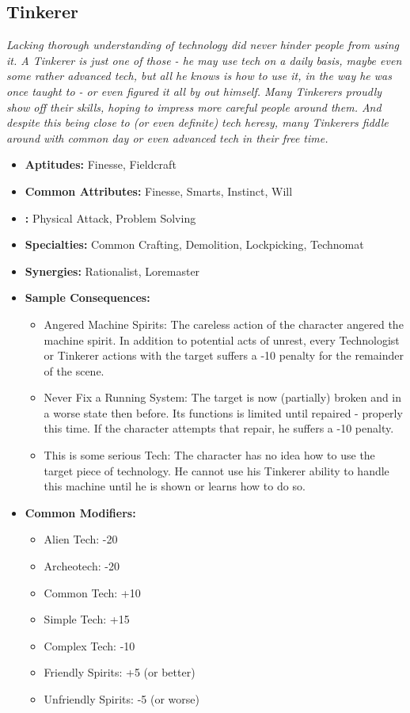 \subsection{Tinkerer}\label{Tinkerer}
\textit{Lacking thorough understanding of technology did never hinder people from using it.
A Tinkerer is just one of those - he may use tech on a daily basis, maybe even some rather advanced tech, but all he knows is how to use it, in the way he was once taught to - or even figured it all by out himself.
Many Tinkerers proudly show off their skills, hoping to impress more careful people around them.
And despite this being close to (or even definite) tech heresy, many Tinkerers fiddle around with common day or even advanced tech in their free time.}
\begin{itemize}
	\item \textbf{Aptitudes:} Finesse, Fieldcraft
	\item \textbf{Common Attributes:} Finesse, Smarts, Instinct, Will
	\item \textbf{:} Physical Attack, Problem Solving
	\item \textbf{Specialties:} Common Crafting, Demolition, Lockpicking, Technomat
	\item \textbf{Synergies:} Rationalist, Loremaster
	\item \textbf{Sample Consequences:} 
	\begin{itemize}
		\item Angered Machine Spirits: The careless action of the character angered the machine spirit. In addition to potential acts of unrest, every Technologist or Tinkerer actions with the target suffers a -10 penalty for the remainder of the scene.
		\item Never Fix a Running System: The target is now (partially) broken and in a worse state then before. Its functions is limited until repaired - properly this time. If the character attempts that repair, he suffers a -10 penalty.
		\item This is some serious Tech: The character has no idea how to use the target piece of technology. He cannot use his Tinkerer ability to handle this machine until he is shown or learns how to do so.
	\end{itemize}
	\item \textbf{Common Modifiers:}
	\begin{itemize}
		\item Alien Tech: -20
		\item Archeotech: -20
		\item Common Tech: +10
		\item Simple Tech: +15
		\item Complex Tech: -10
		\item Friendly Spirits: +5 (or better)
		\item Unfriendly Spirits: -5 (or worse)
	\end{itemize}
\end{itemize}

